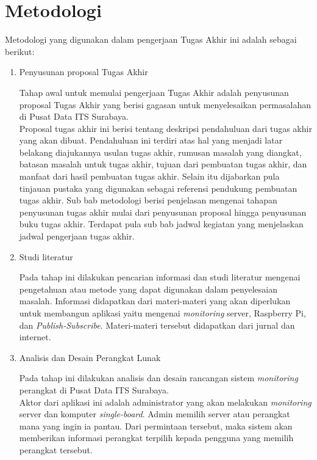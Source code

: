 \section{Metodologi}
Metodologi yang digunakan dalam pengerjaan Tugas Akhir ini adalah sebagai berikut:
\begin{enumerate}
	
	\item Penyusunan proposal Tugas Akhir
	
	\tab Tahap awal untuk memulai pengerjaan Tugas Akhir adalah penyusunan proposal Tugas Akhir yang berisi gagasan untuk menyelesaikan permasalahan di Pusat Data ITS Surabaya.\\
	\tab Proposal tugas akhir ini berisi tentang deskripsi pendahuluan dari tugas akhir yang akan dibuat. Pendahuluan ini terdiri atas hal yang menjadi latar belakang diajukannya usulan tugas akhir, rumusan masalah yang diangkat, batasan masalah untuk tugas akhir, tujuan dari pembuatan tugas akhir, dan manfaat dari hasil pembuatan tugas akhir. Selain itu dijabarkan pula tinjauan pustaka yang digunakan sebagai referensi pendukung pembuatan tugas akhir. Sub bab metodologi berisi penjelasan mengenai tahapan penyusunan tugas akhir mulai dari penyusunan proposal hingga penyusunan buku tugas akhir. Terdapat pula sub bab jadwal kegiatan yang menjelaskan jadwal pengerjaan tugas akhir.
	
	\item Studi literatur
	
	\tab Pada tahap ini dilakukan pencarian informasi dan studi literatur mengenai pengetahuan atau metode yang dapat digunakan dalam penyelesaian masalah. Informasi didapatkan dari materi-materi yang akan diperlukan untuk membangun aplikasi yaitu mengenai \textit{monitoring} server, Raspberry Pi, dan \textit{Publish-Subscribe}. Materi-materi tersebut didapatkan dari jurnal dan internet.
	
	\item Analisis dan Desain Perangkat Lunak
	
	\tab Pada tahap ini dilakukan analisis dan desain rancangan sistem \textit{monitoring} perangkat di Pusat Data ITS Surabaya.\\
	Aktor dari aplikasi ini adalah administrator yang akan melakukan \textit{monitoring} server dan komputer \textit{single-board}. Admin memilih server atau perangkat mana yang ingin ia pantau. Dari permintaan tersebut, maka sistem akan memberikan informasi perangkat terpilih kepada pengguna yang memilih perangkat tersebut.
	

\end{enumerate}

